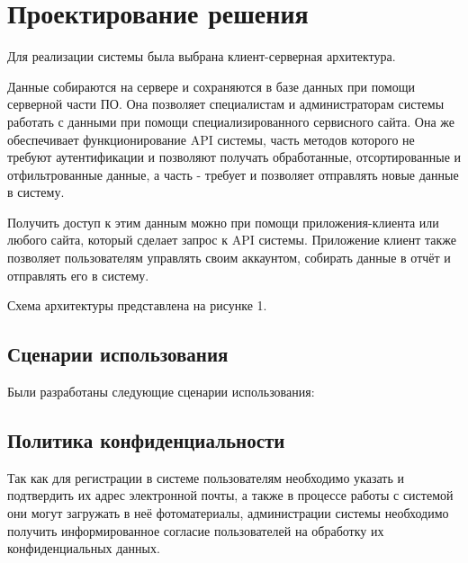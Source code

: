 
\section{Проектирование решения}

\tab
Для реализации системы была выбрана клиент-серверная архитектура.

\tab
Данные собираются на сервере и сохраняются в базе данных при помощи серверной части ПО.
Она позволяет специалистам и администраторам системы работать с данными при помощи специализированного сервисного сайта.
Она же обеспечивает функционирование API системы, часть методов которого не требуют аутентификации и позволяют получать обработанные, отсортированные и отфильтрованные данные, а часть - требует и позволяет отправлять новые данные в систему.

\tab
Получить доступ к этим данным можно при помощи приложения-клиента или любого сайта, который сделает запрос к API системы.
Приложение клиент также позволяет пользователям управлять своим аккаунтом, собирать данные в отчёт и отправлять его в систему.

\tab
Схема архитектуры представлена на рисунке 1.
\pictureone

\subsection{Сценарии использования}

\tab
Были разработаны следующие сценарии использования:


\subsection{Политика конфиденциальности}

\tab
Так как для регистрации в системе пользователям необходимо указать и подтвердить их адрес электронной почты, а также в процессе работы с системой они могут загружать в неё фотоматериалы, администрации системы необходимо получить информированное согласие пользователей на обработку их конфиденциальных данных\cite{privacy-policy}.

